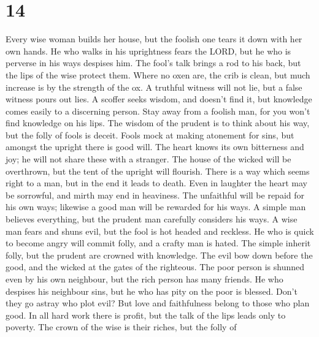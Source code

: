 \hypertarget{section-13}{%
\section{14}\label{section-13}}

 Every wise woman builds her house, but the foolish one
tears it down with her own hands.  He who walks in his
uprightness fears the LORD, but he who is perverse in his ways despises
him.  The fool's talk brings a rod to his back, but the
lips of the wise protect them.  Where no oxen are, the
crib is clean, but much increase is by the strength of the ox.
 A truthful witness will not lie, but a false witness
pours out lies.  A scoffer seeks wisdom, and doesn't find
it, but knowledge comes easily to a discerning person. 
Stay away from a foolish man, for you won't find knowledge on his lips.
 The wisdom of the prudent is to think about his way, but
the folly of fools is deceit.  Fools mock at making
atonement for sins, but amongst the upright there is good will.
 The heart knows its own bitterness and joy; he will not
share these with a stranger.  The house of the wicked
will be overthrown, but the tent of the upright will flourish.
 There is a way which seems right to a man, but in the
end it leads to death.  Even in laughter the heart may be
sorrowful, and mirth may end in heaviness.  The
unfaithful will be repaid for his own ways; likewise a good man will be
rewarded for his ways.  A simple man believes everything,
but the prudent man carefully considers his ways.  A wise
man fears and shuns evil, but the fool is hot headed and reckless.
 He who is quick to become angry will commit folly, and a
crafty man is hated.  The simple inherit folly, but the
prudent are crowned with knowledge.  The evil bow down
before the good, and the wicked at the gates of the righteous.
 The poor person is shunned even by his own neighbour,
but the rich person has many friends.  He who despises
his neighbour sins, but he who has pity on the poor is blessed.
 Don't they go astray who plot evil? But love and
faithfulness belong to those who plan good.  In all hard
work there is profit, but the talk of the lips leads only to poverty.
 The crown of the wise is their riches, but the folly of
